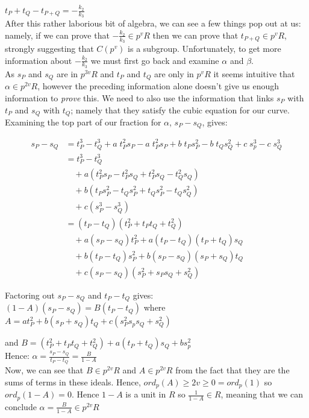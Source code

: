 \documentclass{article}
\begin{document}
$t_P + t_Q - t_{P+Q} = -\frac{k_2}{k_3}$\\

After this rather laborious bit of algebra, we can see a few things pop out at us: namely, if we can prove that $-\frac{k_2}{k_3} \in p^v R$ then we can prove that $t_{P+Q} \in p^v R$, strongly suggesting that $C(p^v)$ is a subgroup. Unfortunately, to get more information about $-\frac{k_2}{k_3}$ we must first go back and examine $\alpha$ and $\beta$. \\

As $s_P$ and $s_Q$ are in $p^{3v}R$ and $t_P$ and $t_Q$ are only in $p^v R$ it seems intuitive that $\alpha \in p^{2v}R$, however the preceding information alone doesn't give us enough information to \emph{prove} this. We need to also use the information that links $s_P$ with $t_P$ and $s_Q$ with $t_Q$; namely that they satisfy the cubic equation for our curve. Examining the top part of our fraction for $\alpha$, $s_P - s_Q$, gives:

\begin{align*} 
s_P - s_Q &= t_P^3 - t_Q^3 + a \; t_P^2 s_P - a \; t_P^2 s_P + b \; t_P s_P^2 - b \; t_Q s_Q^2 + c \; s_p^3 - c \; s_Q^3 \\
&= t_P^3 - t_Q^3 \\
& \quad + a(t_P^2 s_P - t_P^2 s_Q + t_P^2 s_Q - t_Q^2 s_Q) \\
& \quad + b(t_P s_P^2 - t_Q s_P^2 + t_Q s_P^2 - t_Q s_Q^2) \\
& \quad + c(s_P^3 - s_Q^3) \\
&= (t_P - t_Q)(t_P^2 + t_P t_Q + t_Q^2) \\
& \quad + a(s_P - s_Q)t_P^2 + a(t_P - t_Q)(t_P + t_Q)s_Q \\
& \quad + b(t_P - t_Q)s_P^2 + b(s_P - s_Q)(s_P + s_Q)t_Q \\
& \quad + c(s_P - s_Q)(s_P^2 + s_P s_Q + s_Q ^2)
\end{align*} 


Factoring out $s_P - s_Q$ and $t_P - t_Q$ gives:\\

$(1 - A)(s_P - s_Q) = B(t_P - t_Q)$ where $A = a t_P^2 + b(s_P + s_Q)t_Q + c(s_P ^2 s_p s_Q + s_Q^2)$ 

and $B = (t_P^2 + t_P t_Q + t_Q^2) + a (t_P + t_Q)s_Q + b s_p^2$\\

Hence: $\alpha = \frac{s_P - s_Q}{t_P - t_Q} = \frac{B}{1 - A}$\\

Now, we can see that $B \in p^{2v}R$ and $A \in p^{2v} R$ from the fact that they are the sums of terms in these ideals. Hence, $ord_p(A) \geq 2v \geq 0 = ord_p(1)$ so $ord_p(1 - A) = 0$. Hence $1 - A$ is a unit in $R$ so $\frac{1}{1 - A} \in R$, meaning that we can conclude $\alpha = \frac{B}{1 - A} \in p^{2v}R$ \\
\end{document}
